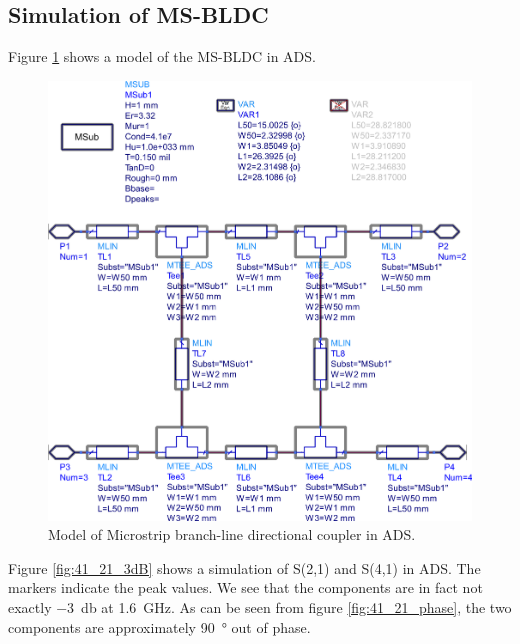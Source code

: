 \subsection{Simulation of MS-BLDC}

Figure \ref{fig:msbldc-model} shows a model of the MS-BLDC in ADS.

\begin{figure}[h t b p]
	\centering
	\includegraphics[width=\textwidth,keepaspectratio]{figures/msbldc-model.eps}
	\caption{Model of Microstrip branch-line directional coupler in ADS.}
	\label{fig:msbldc-model}
\end{figure}

Figure \ref{fig:41_21_3dB} shows a simulation of S(2,1) and S(4,1) in ADS.
The markers indicate the peak values.
We see that the components are in fact not exactly \SI{-3}{\decibel} at \SI{1.6}{\giga\hertz}.
As can be seen from figure \ref{fig:41_21_phase}, the two components are approximately \SI{90}{\degree} out of phase.

